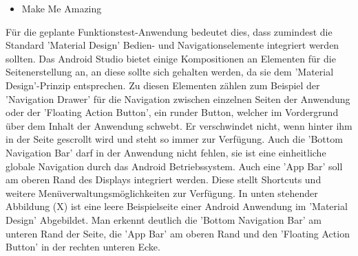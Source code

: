 \begin{itemize}
\begin{list}{}{}
\end{list}
\item Make Me Amazing
\end{itemize}

Für die geplante Funktionstest-Anwendung bedeutet dies, dass zumindest die Standard 'Material Design' Bedien- und Navigationselemente integriert werden sollten. Das Android Studio bietet einige Kompositionen an Elementen für die Seitenerstellung an, an diese sollte sich gehalten werden, da sie dem 'Material Design'-Prinzip entsprechen. Zu diesen Elementen zählen zum Beispiel der 'Navigation Drawer' für die Navigation zwischen einzelnen Seiten der Anwendung oder der 'Floating Action Button', ein runder Button, welcher im Vordergrund über dem Inhalt der Anwendung schwebt. Er verschwindet nicht, wenn hinter ihm in der Seite gescrollt wird und steht so immer zur Verfügung. Auch die 'Bottom Navigation Bar' darf in der Anwendung nicht fehlen, sie ist eine einheitliche globale Navigation durch das Android Betriebssystem. Auch eine 'App Bar' soll am oberen Rand des Displays integriert werden. Diese stellt Shortcuts und weitere Menüverwaltungsmöglichkeiten zur Verfügung. In unten stehender Abbildung (X) ist eine leere Beispielseite einer Android Anwendung im 'Material Design' Abgebildet. Man erkennt deutlich die 'Bottom Navigation Bar' am unteren Rand der Seite, die 'App Bar' am oberen Rand und den 'Floating Action Button' in der rechten unteren Ecke. 

